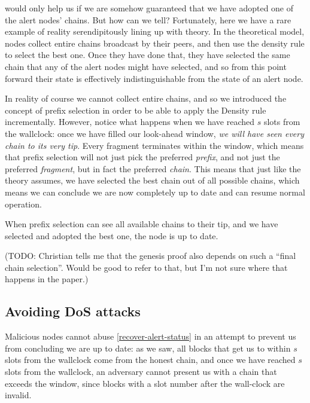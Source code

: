  would only help us if we are somehow
guaranteed that we have adopted one of the alert nodes' chains. But how can we
tell? Fortunately, here we have a rare example of reality serendipitously lining
up with theory. In the theoretical model, nodes collect entire chains broadcast
by their peers, and then use the density rule to select the best one. Once they
have done that, they have selected the same chain that any of the alert nodes
might have selected, and so from this point forward their state is effectively
indistinguishable from the state of an alert node.

In reality of course we cannot collect entire chains, and so we introduced
the concept of prefix selection in order to be able to apply the Density rule
incrementally. However, notice what happens when we have reached $s$ slots
from the wallclock: once we have filled our look-ahead window, \emph{we will
have seen every chain to its very tip}. Every fragment terminates within the
window, which means that prefix selection will not just pick the preferred
\emph{prefix}, and not just the preferred \emph{fragment}, but in fact the
preferred \emph{chain}. This means that just like the theory assumes, we have
selected the best chain out of all possible chains, which means we can
conclude we are now completely up to date and can resume normal operation.

\begin{definition}
\label{recover-alert-status}
When prefix selection can see all available chains to their tip, and we have
selected and adopted the best one, the node is up to date.
\end{definition}

(TODO: Christian tells me that the genesis proof also depends on
such a ``final chain selection''. Would be good to refer to that, but I'm
not sure where that happens in the paper.)

\subsection{Avoiding DoS attacks}
\label{genesis:becoming-alert:DoS}

Malicious nodes cannot abuse \cref{recover-alert-status} in an attempt to
prevent us from concluding we are up to date: as we saw, all blocks that get us
to within $s$ slots from the wallclock come from the honest chain, and once we
have reached $s$ slots from the wallclock, an adversary cannot present us with a
chain that exceeds the window, since blocks with a slot number after the
wall-clock are invalid.

